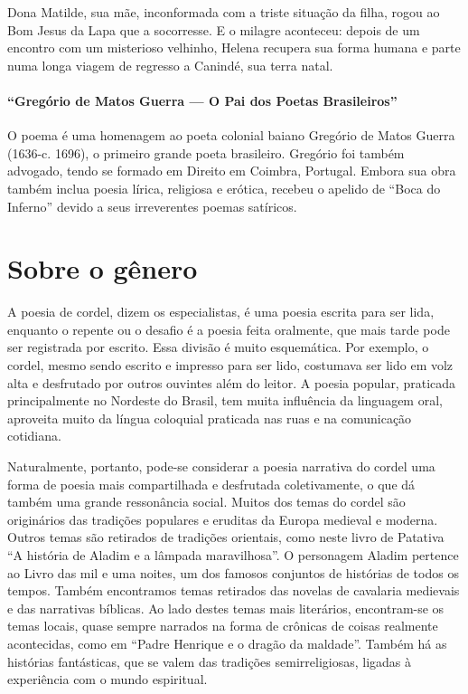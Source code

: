 Dona Matilde, sua mãe, inconformada com a triste situação da filha,
rogou ao Bom Jesus da Lapa que a socorresse. E o milagre aconteceu:
depois de um encontro com um misterioso velhinho, Helena recupera sua
forma humana e parte numa longa viagem de regresso a Canindé, sua terra
natal. 

\paragraph{“Gregório de Matos Guerra — O Pai dos Poetas Brasileiros”}

O poema é uma homenagem ao poeta colonial baiano Gregório de Matos
Guerra (1636-c. 1696), o primeiro grande poeta brasileiro. Gregório foi
também advogado, tendo se formado em Direito em Coimbra, Portugal.
Embora sua obra também inclua poesia lírica, religiosa e erótica,
recebeu o apelido de “Boca do Inferno” devido a seus irreverentes
poemas satíricos.

\section{Sobre o gênero} 

A poesia de cordel, dizem os especialistas, é uma poesia escrita para ser lida,
enquanto o repente ou o desafio é a poesia feita oralmente, que mais tarde pode
ser registrada por escrito. Essa divisão é muito esquemática. Por exemplo, o
cordel, mesmo sendo escrito e impresso para ser lido, costumava ser lido em
volz alta e desfrutado por outros ouvintes além do leitor. A poesia popular,
praticada principalmente no Nordeste do Brasil, tem muita influência da
linguagem oral, aproveita muito da língua coloquial praticada nas ruas e na
comunicação cotidiana. 

Naturalmente, portanto, pode-se considerar a poesia narrativa do cordel uma
forma de poesia mais compartilhada e desfrutada coletivamente, o que dá também
uma grande ressonância social. Muitos dos temas do cordel são originários das
tradições populares e eruditas da Europa medieval e moderna. Outros temas são
retirados de tradições orientais, como neste livro de Patativa “A história de
Aladim e a lâmpada maravilhosa”. O personagem Aladim pertence ao Livro das mil
e uma noites, um dos famosos conjuntos de histórias de todos os tempos. Também
encontramos temas retirados das novelas de cavalaria medievais e das narrativas
bíblicas. Ao lado destes temas mais literários, encontram-se os temas locais,
quase sempre narrados na forma de crônicas de coisas realmente acontecidas,
como em “Padre Henrique e o dragão da maldade”. Também há as histórias
fantásticas, que se valem das tradições semirreligiosas, ligadas à experiência
com o mundo espiritual. 

